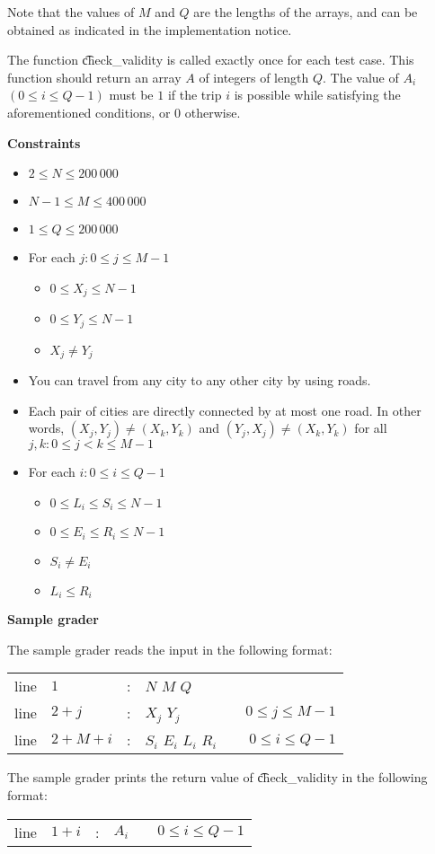 Note that the values of $M$ and $Q$ are the lengths of the arrays, and can be obtained as indicated in the implementation notice.

The function \t{check_validity} is called exactly once for each test case. This function should return an array $A$ of integers of length $Q$. The value of $A_i$ $(0 \le i \le Q-1)$ must be $1$ if the trip $i$ is possible while satisfying the aforementioned conditions, or $0$ otherwise.


\bf{Constraints}

\begin{itemize}
\item $2 \le N \le 200\,000$
\item $N-1 \le M \le 400\,000$
\item $1 \le Q \le 200\,000$
\item For each $j : 0 \le j \le M-1$
\begin{itemize}
\item $0 \le X_j \le N-1$
\item $0 \le Y_j \le N-1$
\item $X_j \neq Y_j$
\end{itemize}
\item You can travel from any city to any other city by using roads. 
\item Each pair of cities are directly connected by at most one road. In other words, $(X_j, Y_j) \neq (X_k, Y_k)$ and $(Y_j, X_j) \neq (X_k, Y_k)$ for all $j, k: 0 \le j < k \le M-1$
\item For each $i: 0 \le i \le Q-1$
\begin{itemize}
\item $0 \le L_i \le S_i \le N-1$
\item $0 \le E_i \le R_i \le N-1$
\item $S_i \neq E_i$
\item $L_i \le R_i$
\end{itemize}
\end{itemize}

\bf{Sample grader}

The sample grader reads the input in the following format:

\begin{tabular}{clclcr}
line&$1$&:&$N$ $M$ $Q$&&\\
line&$2+j$&:&$X_j$ $Y_j$&&$0 \le j \le M-1$\\
line&$2+M+i$&:&$S_i$ $E_i$ $L_i$ $R_i$ &&$0 \le i \le Q-1$\\
\end{tabular}

The sample grader prints the return value of \t{check_validity} in the following format: 

\begin{tabular}{clclcr}
line&$1+i$&:&$A_i$&&$0 \le i \le Q-1$
\end{tabular}
